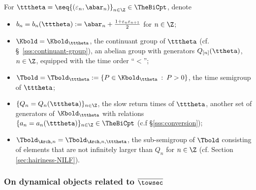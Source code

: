 \documentclass{amsart}
\begin{document}
For $\tttheta = \seq{(\varepsilon_n,\abar_n)}_{n\in \Z} \in \TheBiCpt$, denote
\begin{itemize}
    \item $b_n = b_n(\tttheta) := \abar_n + \frac{1+\varepsilon_n \varepsilon_{n+1}}{2}$ for $n \in \Z$;
    \item $\Kbold = \Kbold_{\tttheta}$, the continuant group of $\tttheta$ (cf. \S~\ref{sss:continuant-group}), an abelian group with generators $Q_{[n]}(\ttheta)$, $n \in \Z$, equipped with the time order ``$<$'';
    \item $\Tbold = \Tbold_{\tttheta} := \{ P \in \Kbold_{\ttheta} \: : \: P > 0 \}$, the time semigroup of $\tttheta$;
    \item $\{ Q_n = Q_n(\tttheta) \}_{n \in \Z}$, the slow return times of $\tttheta$, another set of generators of $\Kbold_{\tttheta}$ with relations $\{a_n=a_n(\tttheta)\}_{n\in\Z} \in \TheBiCpt$ (c.f \S\ref{sss:conversion});
    \item $\Tbold_{\Arch, n} = \Tbold_{\Arch, n, \tttheta}$, the sub-semigroup of $\Tbold$ consisting of elements that are not infinitely larger than $Q_n$ for $n \in \Z$ (cf. Section \ref{sec:hairiness-NILF}).
\end{itemize}

\subsubsection{On dynamical objects related to $\overline{\towsec}$}
\label{sss:notation-for-towsec}
\end{document}
